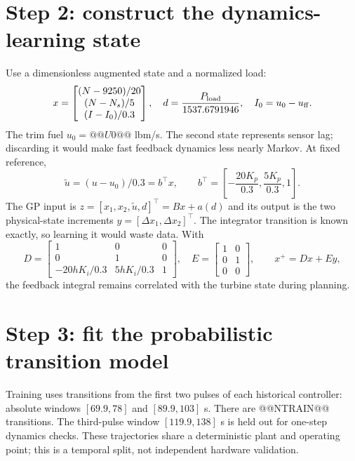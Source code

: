 \documentclass[11pt,a4paper]{article}
\begin{document}
\section{Step 2: construct the dynamics-learning state}
Use a dimensionless augmented state and a normalized load:
\begin{equation}
 x=\begin{bmatrix}(N-9250)/20\\(N-N_s)/5\\(I-I_0)/0.3\end{bmatrix},\quad
 d=\frac{P_{\rm load}}{1537.6791946},\quad I_0=u_0-u_{\rm ff}.
\end{equation}
The trim fuel $u_0=@@U0@@$ lbm/s. The second state represents sensor lag; discarding it would make fast feedback dynamics less nearly Markov. At fixed reference,
\begin{equation}
 \tilde u=(u-u_0)/0.3=b^\top x,\qquad
 b^\top=\left[-\frac{20K_p}{0.3},\frac{5K_p}{0.3},1\right].
\end{equation}
The GP input is $z=[x_1,x_2,\tilde u,d]^\top=B x+a(d)$ and its output is the two physical-state increments $y=[\Delta x_1,\Delta x_2]^\top$. The integrator transition is known exactly, so learning it would waste data. With
\begin{equation}
 D=\begin{bmatrix}1&0&0\\0&1&0\\-20hK_i/0.3&5hK_i/0.3&1\end{bmatrix},\quad
 E=\begin{bmatrix}1&0\\0&1\\0&0\end{bmatrix},\qquad x^+=Dx+Ey,
\end{equation}
the feedback integral remains correlated with the turbine state during planning.

\section{Step 3: fit the probabilistic transition model}
Training uses transitions from the first two pulses of each historical controller: absolute windows $[69.9,78]$ and $[89.9,103]$ s. There are @@NTRAIN@@ transitions. The third-pulse window $[119.9,138]$ s is held out for one-step dynamics checks. These trajectories share a deterministic plant and operating point; this is a temporal split, not independent hardware validation.
\end{document}
